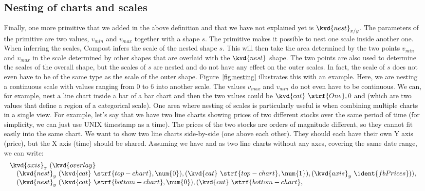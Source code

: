 \documentclass{jfp}
\begin{document}
{\subsection*{Nesting of charts and scales}
Finally, one more primitive that we added in the above definition and that we have not explained
yet is $\kvd{nest}_{x/y}$. The parameters of the primitive are two values, $v_{min}$ and $v_{max}$
together with a shape $s$. The primitive makes it possible to nest one scale inside another
one.
When inferring the scales, Compost infers the scale of the nested shape $s$. This will then take
the area determined by the two points $v_{min}$ and $v_{max}$ in the scale determined by other
shapes that are overlaid with the $\kvd{nest}$ shape. The two points are also used to determine
the scales of the overall shape, but the scales of $s$ are nested and do not have any effect on
the outer scales. In fact, the scale of $s$ does not even have to be of the same type as the
scale of the outer shape.
Figure~\ref{fig:nesting} illustrates this with an example. Here, we are nesting a continuous scale
with values ranging from $\num{0}$ to $\num{6}$ into another scale. The values $v_{max}$ and
$v_{min}$ do not even have to be continuous. We can, for example, nest a line chart inside a
bar of a bar chart and then the two values could be $\kvd{cat}~\strf{One}, 0$ and %
(which are two values that define a region of a categorical scale).
One area where nesting of scales is particularly useful is when combining multiple charts in
a single view. For example, let's say that we have two line charts showing prices of two different
stocks over the same period of time (for simplicity, we can just use UNIX timestamp as a time).
The prices of the two stocks are orders of magnitude different, so they cannot fit easily into the
same chart. We want to show two line charts side-by-side (one above each other). They should each
have their own Y axis (price), but the X axis (time) should be shared.
Assuming we have  and  as two line charts without any axes,
covering the same date range, we can write:
%
\begin{equation*}
\begin{array}{l}
\kvd{axis}_x~(\kvd{overlay}\\
\quad (\kvd{nest}_y~(\kvd{cat}~\strf{top-chart}, \num{0}), (\kvd{cat}~\strf{top-chart}, \num{1}),
 (\kvd{axis}_y~\ident{fbPrices})),\\
\quad (\kvd{nest}_y~(\kvd{cat}~\strf{bottom-chart}, \num{0}), (\kvd{cat}~\strf{bottom-chart}, %

\end{array}
\end{equation*}}
\end{document}
